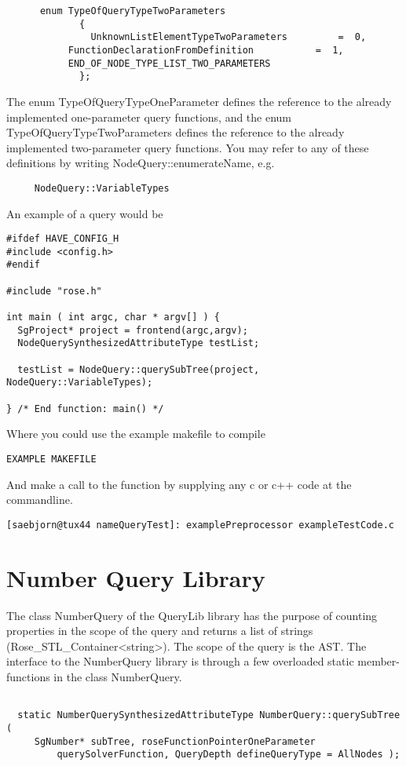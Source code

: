 {\begin{verbatim}
	  enum TypeOfQueryTypeTwoParameters
             {
               UnknownListElementTypeTwoParameters         =  0,
	       FunctionDeclarationFromDefinition           =  1,
	       END_OF_NODE_TYPE_LIST_TWO_PARAMETERS
             };
\end{verbatim}
The enum TypeOfQueryTypeOneParameter defines the reference to the
already implemented one-parameter query functions, and the enum 
TypeOfQueryTypeTwoParameters defines the reference to the already
implemented two-parameter query functions. You may refer to any of
these definitions by writing NodeQuery::enumerateName, e.g.
\begin{verbatim}
     NodeQuery::VariableTypes
\end{verbatim}
An example of a query would be 
\begin{verbatim}
#ifdef HAVE_CONFIG_H
#include <config.h>
#endif

#include "rose.h"

int main ( int argc, char * argv[] ) {
  SgProject* project = frontend(argc,argv);
  NodeQuerySynthesizedAttributeType testList;
  
  testList = NodeQuery::querySubTree(project, NodeQuery::VariableTypes);

} /* End function: main() */
\end{verbatim}
Where you could use the example makefile to compile
\begin{verbatim}
EXAMPLE MAKEFILE
\end{verbatim}
And make a call to the function by supplying any c or c++ code at the commandline.
\begin{verbatim}
[saebjorn@tux44 nameQueryTest]: examplePreprocessor exampleTestCode.c
\end{verbatim}

\section{Number Query Library}
 
The class NumberQuery of the QueryLib library has the purpose of
counting properties in the scope of the query and returns a list of
strings (Rose_STL_Container<string>). The scope of the query is
the AST. The interface to the NumberQuery library is through a few
overloaded static member-functions in the class NumberQuery.

\begin{verbatim}

  static NumberQuerySynthesizedAttributeType NumberQuery::querySubTree (
	 SgNumber* subTree, roseFunctionPointerOneParameter 
         querySolverFunction, QueryDepth defineQueryType = AllNodes );


\end{verbatim}}
